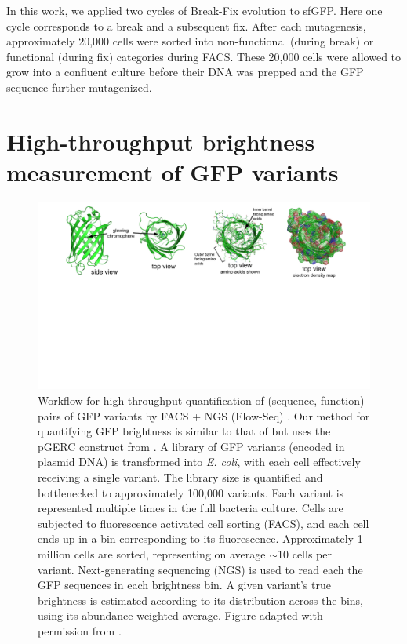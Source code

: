 In this work, we applied two cycles of Break-Fix evolution to sfGFP. Here one cycle corresponds to a break and a subsequent fix. After each mutagenesis, approximately 20,000 cells were sorted into non-functional (during break) or functional (during fix) categories during FACS. These 20,000 cells were allowed to grow into a confluent culture before their DNA was prepped and the GFP sequence further mutagenized. 


\section{High-throughput brightness measurement of GFP variants}
\label{sec:flow-seq}

\begin{figure}[h]
  \includegraphics[width=1\linewidth,page=6,trim={0cm 7cm 0cm 0}]{figures/2018-05-09-NIPS_2018_Figures.pdf}
  \caption[Workflow for high-throughput quantification of (sequence, function) pairs of GFP variants by FACS + NGS (Flow-Seq)]{Workflow for high-throughput quantification of (sequence, function) pairs of GFP variants by FACS + NGS (Flow-Seq) \cite{Kosuri2013-vt}. 
  Our method for quantifying GFP brightness is similar to that of \cite{Sarkisyan2016-cr} but uses the pGERC construct from \cite{Kosuri2013-vt}.
  A library of GFP variants (encoded in plasmid DNA) is transformed into \textit{E. coli}, with each cell effectively receiving a single variant. The library size is quantified and bottlenecked to approximately 100,000 variants. Each variant is represented multiple times in the full bacteria culture.
  Cells are subjected to fluorescence activated cell sorting (FACS), and each cell ends up in a bin corresponding to its fluorescence. Approximately 1-million cells are sorted, representing on average $\sim$10 cells per variant.
  Next-generating sequencing (NGS) is used to read each the GFP sequences in each brightness bin. A given variant's true brightness is estimated according to its distribution across the bins, using its abundance-weighted average. Figure adapted with permission from \cite{Kosuri2013-vt}.}
\end{figure}



